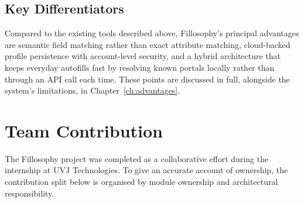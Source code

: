\documentclass[12pt,a4paper]{report}
\begin{document}
\section{Key Differentiators}
Compared to the existing tools described above, Fillosophy's principal advantages are semantic field matching rather than exact attribute matching, cloud-backed profile persistence with account-level security, and a hybrid architecture that keeps everyday autofills fast by resolving known portals locally rather than through an API call each time. These points are discussed in full, alongside the system's limitations, in Chapter~\ref{ch:advantages}.

\chapter{Team Contribution}
The Fillosophy project was completed as a collaborative effort during the internship at UVJ Technologies. To give an accurate account of ownership, the contribution split below is organised by module ownership and architectural responsibility.
\end{document}
